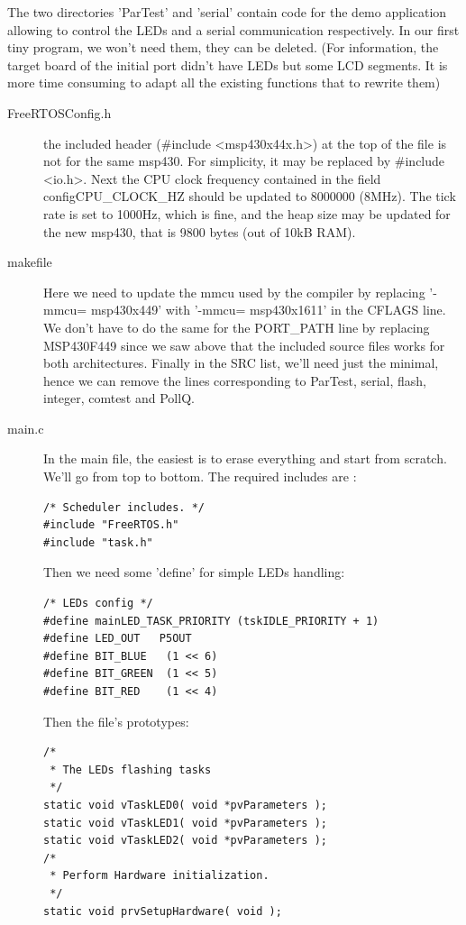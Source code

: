 \documentclass[11pt]{report}
\begin{document}
The two directories 'ParTest' and 'serial' contain code for the demo application allowing to control the LEDs and a serial communication respectively. In our first tiny program, we won't need them, they can be deleted. (For information, the target board of the initial port didn't have LEDs but some LCD segments. It is more time consuming to adapt all the existing functions that to rewrite them)

\begin{description}
  \item[FreeRTOSConfig.h] the included header (\#include <msp430x44x.h>) at the top of the file is not for the same msp430. For simplicity, it may be replaced by \#include <io.h>. Next the CPU clock frequency contained in the field configCPU\_CLOCK\_HZ should be updated to 8000000 (8MHz). The tick rate is set to 1000Hz, which is fine, and the heap size may be updated for the new msp430, that is 9800 bytes (out of 10kB RAM).

  \item[makefile] Here we need to update the mmcu used by the compiler by replacing '-mmcu= msp430x449' with '-mmcu= msp430x1611' in the CFLAGS line. We don't have to do the same for the PORT\_PATH line by replacing MSP430F449 since we saw above that the included source files works for both architectures. Finally in the SRC list, we'll need just the minimal, hence we can remove the lines corresponding to ParTest, serial, flash, integer, comtest and PollQ.

  \item[main.c] In the main file, the easiest is to erase everything and start from scratch. We'll go from top to bottom. The required includes are :
\begin{verbatim}
/* Scheduler includes. */
#include "FreeRTOS.h"
#include "task.h"
\end{verbatim}

Then we need some 'define' for simple LEDs handling:
\begin{verbatim}
/* LEDs config */
#define mainLED_TASK_PRIORITY (tskIDLE_PRIORITY + 1)
#define LED_OUT   P5OUT
#define BIT_BLUE   (1 << 6)
#define BIT_GREEN  (1 << 5)
#define BIT_RED    (1 << 4)
\end{verbatim}

Then the file's prototypes:
\begin{verbatim}
/* 
 * The LEDs flashing tasks
 */ 
static void vTaskLED0( void *pvParameters );
static void vTaskLED1( void *pvParameters );
static void vTaskLED2( void *pvParameters );
/*
 * Perform Hardware initialization.
 */
static void prvSetupHardware( void );


\end{verbatim}
\end{description}
\end{document}
